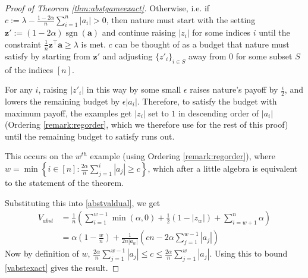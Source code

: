 \documentclass{article}[12pt]
\theoremstyle{named}
\newcommand{\va}{\mathbf{a}}
\newcommand{\vz}{\mathbf{z}}
\DeclareMathOperator{\sgn}{sgn}
\newcommand{\abs}[1]{\left| #1 \right|}
\newcommand{\lrp}[1]{\left(#1\right)}
\begin{document}
\begin{proof}[Proof of Theorem \ref{thm:abstgameexact}]
Otherwise, i.e. if $c := \lambda - \frac{1 - 2 \alpha}{n} \sum_{i=1}^n \abs{a_i} > 0$, 
then nature must start with the setting $\vz' := (1 - 2 \alpha) \sgn(\va)$ and continue raising $\abs{z_i}$ for some indices $i$ 
until the constraint $\frac{1}{n} \vz^\top \va \geq \lambda$ is met. 
$c$ can be thought of as a budget that nature must satisfy by starting from $\vz'$ 
and adjusting $\{z'_i\}_{i \in S}$ away from $0$ for some subset $S$ of the indices $[n]$.

For any $i$, raising $\abs{z'_i}$ in this way by some small $\epsilon$ raises nature's payoff by $\frac{\epsilon}{2}$, 
and lowers the remaining budget by $\epsilon \abs{a_i}$.
Therefore, to satisfy the budget with maximum payoff, 
the examples get $\abs{z_i}$ set to $1$ in descending order of $\abs{a_i}$ 
(Ordering \ref{remark:regorder}, which we therefore use for the rest of this proof)
until the remaining budget to satisfy runs out.

This occurs on the $w^{th}$ example (using Ordering \ref{remark:regorder}), 
where $w = \min \left\{ i \in [n] : \frac{2 \alpha}{n} \sum_{j=1}^i \abs{a_j} \geq c \right\}$, 
which after a little algebra is equivalent to the statement of the theorem. 

Substituting this into \eqref{abstvaldual}, we get
\begin{align}
\label{vabstexact}
V_{abst} &= \frac{1}{n} \lrp{ \sum_{i=1}^{w-1} \min \lrp{ \alpha, 0} + \frac{1}{2} \lrp{1 - \abs{z_w}} + \sum_{i=w+1}^n \alpha } \nonumber \\
&= \alpha \lrp{1 - \frac{w}{n}} + \frac{1}{2 n \abs{a_w}} \lrp{cn - 2 \alpha \sum_{j=1}^{w-1} \abs{a_j} } 
\end{align}
Now by definition of $w$, 
$\frac{2 \alpha}{n} \sum_{j=1}^{w-1} \abs{a_j} \leq c \leq \frac{2 \alpha}{n} \sum_{j=1}^w \abs{a_j}$. 
Using this to bound \eqref{vabstexact} gives the result.
\end{proof}
\end{document}
